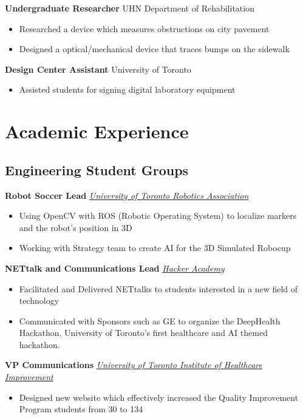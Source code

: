 \documentclass[10pt, a4paper]{cv}
\begin{document}
	\textbf{Undergraduate Researcher} \hfill UHN Department of Rehabilitation
	\begin{itemize}
		\item Researched a device which measures obstructions on city pavement
		\item Designed a optical/mechanical device that traces bumps on the sidewalk
	\end{itemize}
	
	\textbf{Design Center Assistant} \hfill University of Toronto
	\begin{itemize}
		\item Assisted students for signing digital laboratory equipment
	\end{itemize}

\section*{Academic Experience}

\subsection*{Engineering Student Groups}\noindent

	\textbf{Robot Soccer Lead} \hfill \emph{\href{http://www.utra.ca}{University of Toronto Robotics Association}}
	\begin{itemize}
		\item Using OpenCV with ROS (Robotic Operating System) to localize markers and the robot's position in 3D
		\item Working with Strategy team to create AI for the 3D Simulated Robocup
	\end{itemize}
	
	\textbf{NETtalk and Communications Lead} \hfill \emph{\href{http://hackeracademy.org}{Hacker Academy}}
	\begin{itemize}
		\item Facilitated and Delivered NETtalks to students interested in a new field of technology
		\item Communicated with Sponsors such as GE to organize the DeepHealth Hackathon, University of Toronto's first healthcare and AI themed hackathon.
	\end{itemize}
	
	\textbf{VP Communications} \hfill \emph{\href{http://www.utihiopenschool.ca}{University of Toronto Institute of Healthcare Improvement}}
	\begin{itemize}
		\item Designed new website which effectively increased the Quality Improvement Program students from 30 to 134
	\end{itemize}
	
\end{document}
